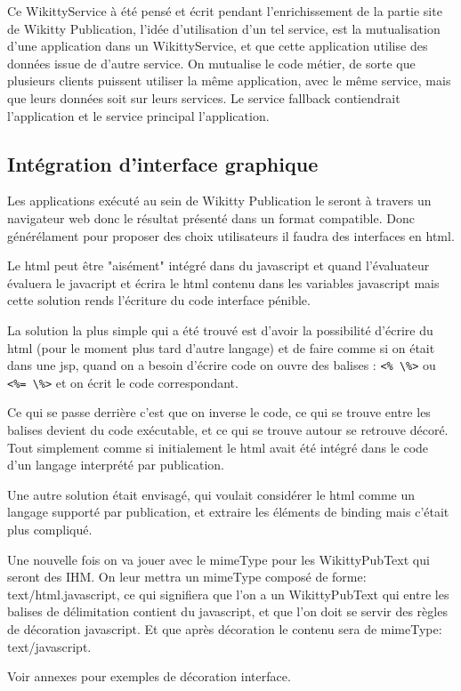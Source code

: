 Ce WikittyService à été pensé et écrit pendant l'enrichissement de la partie 
site de Wikitty Publication, l'idée d'utilisation d'un tel service, est la 
mutualisation d'une application dans un WikittyService, et que cette 
application utilise des données issue de d'autre service. On mutualise le code 
métier, de sorte que plusieurs clients puissent utiliser la même application, 
avec le même service, mais que leurs données soit sur leurs services.
Le service fallback contiendrait l'application et le service principal 
l'application.

\subsection{Intégration d'interface graphique}

Les applications exécuté au sein de Wikitty Publication le seront à travers 
un navigateur web donc le résultat présenté dans un format compatible.
Donc générélament pour proposer des choix utilisateurs il faudra des interfaces
en html.

Le html peut être "aisément" intégré dans du javascript et quand l'évaluateur
évaluera le javacript et écrira le html contenu dans les variables javascript
mais cette solution rends l'écriture du code interface pénible.

La solution la plus simple qui a été trouvé est d'avoir la possibilité d'écrire 
du html (pour le moment plus tard d'autre langage) et de faire comme si on était
dans une jsp, quand on a besoin d'écrire code on ouvre des balises : \verb!<% \%>!
ou \verb!<%= \%>! et on écrit le code correspondant.

Ce qui se passe derrière c'est que on inverse le code, ce qui se trouve entre
les balises devient du code exécutable, et ce qui se trouve autour se retrouve
décoré. Tout simplement comme si initialement le html avait été intégré dans
le code d'un langage interprété par publication.

Une autre solution était envisagé, qui voulait considérer le html comme un langage
supporté par publication, et extraire les éléments de binding mais c'était plus 
compliqué.

Une nouvelle fois on va jouer avec le mimeType pour les WikittyPubText qui 
seront des IHM. On leur mettra un mimeType composé de forme: text/html.javascript,
ce qui signifiera que l'on a un WikittyPubText qui entre les balises de délimitation
contient du javascript, et que l'on doit se servir des règles de décoration javascript.
Et que après décoration le contenu sera de mimeType: text/javascript.

Voir annexes pour exemples de décoration interface.

